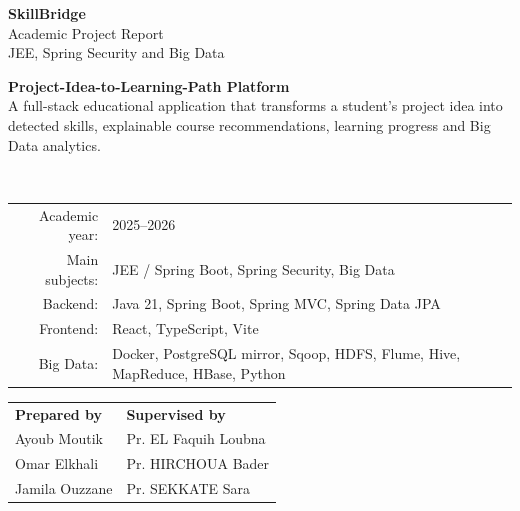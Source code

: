 \documentclass[12pt,a4paper]{report}
\newcommand{\projectName}{SkillBridge}
\begin{document}
\begin{titlepage}
    \thispagestyle{empty}
    \begin{center}
        \vspace*{1.2cm}
        {\Huge\bfseries \projectName}\\[0.35cm]
        {\Large Academic Project Report}\\[0.25cm]
        {\large JEE, Spring Security and Big Data}\\[1.2cm]

        \colorbox{sbNavy}{
            \begin{minipage}{0.86\textwidth}
                \centering
                \vspace{0.45cm}
                {\color{white}\Large\bfseries Project-Idea-to-Learning-Path Platform}\\[0.35cm]
                {\color{sbSky}\normalsize A full-stack educational application that transforms a student's project idea into detected skills, explainable course recommendations, learning progress and Big Data analytics.}
                \vspace{0.45cm}
            \end{minipage}
        }\\[1.2cm]

        \begin{tabular}{rl}
            Academic year: & 2025--2026\\
            Main subjects: & JEE / Spring Boot, Spring Security, Big Data\\
            Backend: & Java 21, Spring Boot, Spring MVC, Spring Data JPA\\
            Frontend: & React, TypeScript, Vite\\
            Big Data: & Docker, PostgreSQL mirror, Sqoop, HDFS, Flume, Hive, MapReduce, HBase, Python\\
        \end{tabular}

        \vfill
        \begin{tabularx}{0.82\textwidth}{X X}
            \textbf{Prepared by} & \textbf{Supervised by}\\
            Ayoub Moutik & Pr. EL Faquih Loubna\\
            Omar Elkhali & Pr. HIRCHOUA Bader\\
            Jamila Ouzzane & Pr. SEKKATE Sara\\
        \end{tabularx}
        \vspace*{0.8cm}
    \end{center}
\end{titlepage}
\end{document}
